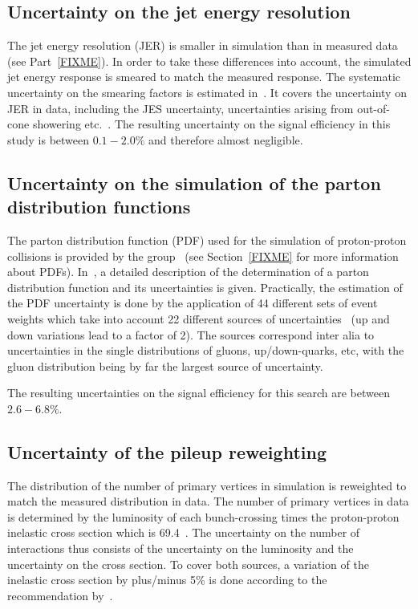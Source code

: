 \subsection*{Uncertainty on the jet energy resolution}
The jet energy resolution (JER) is smaller in simulation than in measured data (see Part~\ref{FIXME}). 
In order to take these differences into account, the simulated jet energy response is smeared to match the measured response.
The systematic uncertainty on the smearing factors is estimated in~\cite{bib:CMS:JME_PAS,bib:Kristin_Thesis}.
It covers the uncertainty on JER in data, including the JES uncertainty, uncertainties arising from out-of-cone showering etc.~\cite{bib:CMS:JME_PAS,bib:Kristin_Thesis}.
The resulting uncertainty on the signal efficiency in this study is between $0.1-2.0\%$ and therefore almost negligible.

\subsection*{Uncertainty on the simulation of the parton distribution functions}
The parton distribution function (PDF) used for the simulation of proton-proton collisions is provided by the \cteq group~\cite{Pumplin:2002vw} (see Section~\ref{FIXME} for more information about PDFs).
In~\cite{Pumplin:2002vw}, a detailed description of the determination of a parton distribution function and its uncertainties is given.
Practically, the estimation of the PDF uncertainty is done by the application of 44 different sets of event weights which take into account 22 different sources of uncertainties~\cite{Botje:2011sn,bib:PDF_practical} 
(up and down variations lead to a factor of 2).
The sources correspond inter alia to uncertainties in the single distributions of gluons, up/down-quarks, etc, with the gluon distribution being by far the largest source of uncertainty.

The resulting uncertainties on the signal efficiency for this search are between $2.6-6.8\%$.

\subsection*{Uncertainty of the pileup reweighting}
The distribution of the number of primary vertices in simulation is reweighted to match the measured distribution in data.
The number of primary vertices in data is determined by the luminosity of each bunch-crossing times the proton-proton inelastic cross section which is 69.4\mb~\cite{bib:CMS:PileupUtilities}.
The uncertainty on the number of interactions thus consists of the uncertainty on the luminosity and the uncertainty on the cross section.
To cover both sources, a variation of the inelastic cross section by plus/minus 5\% is done according to the recommendation by~\cite{bib:CMS:PileupSysUnc}.

